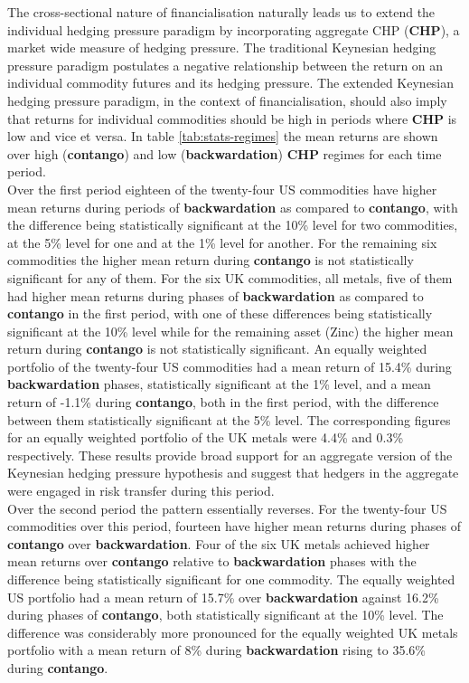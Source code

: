 \documentclass[]{elsarticle} %
\begin{document}
The cross-sectional nature of financialisation naturally leads us to extend the individual hedging pressure paradigm by incorporating aggregate CHP (\textbf{CHP}), a market wide measure of hedging pressure. The traditional Keynesian hedging pressure paradigm postulates a negative relationship between the return on an individual commodity futures and its hedging pressure. The extended Keynesian hedging pressure paradigm, in the context of financialisation, should also imply that returns for individual commodities should be high in periods where \textbf{CHP} is low and vice et versa. In table \ref{tab:stats-regimes} the mean returns are shown over high (\textbf{contango}) and low (\textbf{backwardation}) \textbf{CHP} regimes for each time period.\\
Over the first period eighteen of the twenty-four US commodities have higher mean returns during periods of \textbf{backwardation} as compared to \textbf{contango}, with the difference being statistically significant at the 10\% level for two commodities, at the 5\% level for one and at the 1\% level for another. For the remaining six commodities the higher mean return during \textbf{contango} is not statistically significant for any of them. For the six UK commodities, all metals, five of them had higher mean returns during phases of \textbf{backwardation} as compared to \textbf{contango} in the first period, with one of these differences being statistically significant at the 10\% level while for the remaining asset (Zinc) the higher mean return during \textbf{contango} is not statistically significant. An equally weighted portfolio of the twenty-four US commodities had a mean return of 15.4\% during \textbf{backwardation} phases, statistically significant at the 1\% level, and a mean return of -1.1\% during \textbf{contango}, both in the first period, with the difference between them statistically significant at the 5\% level. The corresponding figures for an equally weighted portfolio of the UK metals were 4.4\% and 0.3\% respectively. These results provide broad support for an aggregate version of the Keynesian hedging pressure hypothesis and suggest that hedgers in the aggregate were engaged in risk transfer during this period.\\
Over the second period the pattern essentially reverses. For the twenty-four US commodities over this period, fourteen have higher mean returns during phases of \textbf{contango} over \textbf{backwardation}. Four of the six UK metals achieved higher mean returns over \textbf{contango} relative to \textbf{backwardation} phases with the difference being statistically significant for one commodity. The equally weighted US portfolio had a mean return of 15.7\% over \textbf{backwardation} against 16.2\% during phases of \textbf{contango}, both statistically significant at the 10\% level. The difference was considerably more pronounced for the equally weighted UK metals portfolio with a mean return of 8\% during \textbf{backwardation} rising to 35.6\% during \textbf{contango}.
\end{document}
